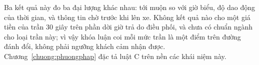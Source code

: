 Ba kết quả này đo ba đại lượng khác nhau: tới muộn so với giờ biểu, độ dao động của thời gian, và thông tin chờ trước
khi lên xe. Không kết quả nào cho một giá tiền của trần 30 giây trên phần dời giờ trả do điều phối, và chưa có chuẩn
ngành cho loại trần này; vì vậy khóa luận coi mỗi mức trần là một điểm trên đường đánh đổi, không phải ngưỡng khách
cảm nhận được. Chương~\ref{chuong:phuongphap} đặc tả luật C trên nền các khái niệm này.

